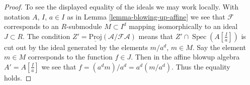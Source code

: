 \documentclass[10pt,a4paper]{amsart}
\theoremstyle{plain}
\theoremstyle{definition}
\theoremstyle{remark}
\numberwithin{equation}{subsection}
\def\Spec{\mathop{\mathrm{Spec}}}
\begin{document}
\begin{proof}
\medskip\noindent
To see the displayed equality of the ideals we may work locally.
With notation $A$, $I$, $a \in I$ as in Lemma \ref{lemma-blowing-up-affine}
we see that $\mathcal{F}$ corresponds to an $R$-submodule $M \subset I^d$
mapping isomorphically to an ideal $J \subset R$. The condition
$Z' = \underline{\text{Proj}}(\mathcal{A}/\mathcal{F}\mathcal{A})$
means that $Z' \cap \Spec(A[\frac{I}{a}])$ is cut out by the ideal
generated by the elements $m/a^d$, $m \in M$. Say the element $m \in M$
corresponds to the function $f \in J$. Then in the affine blowup algebra
$A' = A[\frac{I}{a}]$ we see that $f = (a^dm)/a^d = a^d (m/a^d)$.
Thus the equality holds.
\end{proof}
\end{document}
